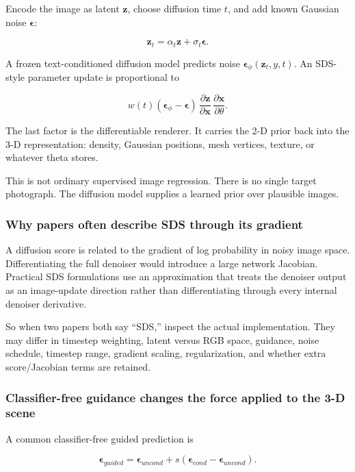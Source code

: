 Encode the image as latent \(\mathbf z\), choose diffusion time \(t\), and add known Gaussian noise \(\boldsymbol\epsilon\):

\[\mathbf z_t=\alpha_t\mathbf z+\sigma_t\boldsymbol\epsilon.\]

A frozen text-conditioned diffusion model predicts noise \(\boldsymbol\epsilon_\phi(\mathbf z_t,y,t)\). An SDS-style parameter update is proportional to

\[w(t)(\boldsymbol\epsilon_\phi-\boldsymbol\epsilon)\,\frac{\partial\mathbf z}{\partial\mathbf x}\,\frac{\partial\mathbf x}{\partial\theta}.\]

The last factor is the differentiable renderer. It carries the 2-D prior back into the 3-D representation: density, Gaussian positions, mesh vertices, texture, or whatever theta stores.

This is not ordinary supervised image regression. There is no single target photograph. The diffusion model supplies a learned prior over plausible images.

\subsubsection{Why papers often describe SDS through its gradient}\label{why-papers-often-describe-sds-through-its-gradient}

A diffusion score is related to the gradient of log probability in noisy image space. Differentiating the full denoiser would introduce a large network Jacobian. Practical SDS formulations use an approximation that treats the denoiser output as an image-update direction rather than differentiating through every internal denoiser derivative.

So when two papers both say ``SDS,'' inspect the actual implementation. They may differ in timestep weighting, latent versus RGB space, guidance, noise schedule, timestep range, gradient scaling, regularization, and whether extra score/Jacobian terms are retained.

\subsubsection{Classifier-free guidance changes the force applied to the 3-D scene}\label{classifier-free-guidance-changes-the-force-applied-to-the-3-d-scene}

A common classifier-free guided prediction is

\[\boldsymbol\epsilon_{guided}=\boldsymbol\epsilon_{uncond}+s(\boldsymbol\epsilon_{cond}-\boldsymbol\epsilon_{uncond}).\]

